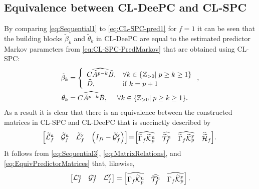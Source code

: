 \subsection{Equivalence between \ac{CL-DeePC} and \ac{CL-SPC}}
By comparing \eqref{eq:Sequential1} to \eqref{eq:CL-SPC-pred1} for $f=1$ it can be seen that the building blocks $\tilde{\beta}_k$ and $\tilde{\theta}_k$ in \ac{CL-DeePC} are equal to the estimated predictor Markov parameters from \eqref{eq:CL-SPC-PredMarkov} that are obtained using \ac{CL-SPC}:
\begin{subequations}\label{eq:EquivMarkov}
	\begin{align}
		\tilde{\beta}_k &= \left\{\begin{array}{ll}
			\widehat{C\tilde{A}^{p-k}\tilde{B}}, &\forall k\in\{\mathbb{Z}_{>0}|\;p \geq k \geq 1\}\\
			\widehat{D}, &\text{if } k=p+1
		\end{array}\right.,\label{eq:EquivMarkovInputs}\\
	\tilde{\theta}_k &= \widehat{C\tilde{A}^{p-k}\tilde{B}},\mkern24mu \forall k\in\{\mathbb{Z}_{>0}|\;p \geq k \geq 1\}\label{eq:EquivMarkovOutputs}.
	\end{align}
\end{subequations}
As a result it is clear that there is an equivalence between the constructed matrices in \ac{CL-SPC} and \ac{CL-DeePC} that is succinctly described by
\begin{align}\label{eq:EquivPredictorMatrices}
	\mkern-3mu\begin{bmatrix}
		\widetilde{\mathcal{L}}^\mathrm{u}_f & \widetilde{\mathcal{G}}^\mathrm{u}_f & \widetilde{\mathcal{L}}^\mathrm{y}_f & \left(I_{fl}-\widetilde{\mathcal{G}}^\mathrm{y}_f\right)
	\end{bmatrix}\mkern-3mu=\mkern-3mu\begin{bmatrix}
		\widehat{\widetilde{\Gamma}_f\widetilde{\mathcal{K}}_{p}^{\mathrm{{u}}}} & \widehat{\widetilde{\mathcal{T}}_f^\mathrm{u}} & \widehat{\widetilde{\Gamma}_f\widetilde{\mathcal{K}}_{p}^{\mathrm{{y}}}} & \widehat{\widetilde{\mathcal{H}}}_f
	\end{bmatrix}\mkern-3mu.
\end{align}
It follows from \eqref{eq:Sequential3}, \eqref{eq:MatrixRelations}, and \eqref{eq:EquivPredictorMatrices} that, likewise,
\begin{align}\label{eq:EquivInnovationMatrices}
	\begin{bmatrix}
		\mathcal{L}^\mathrm{u}_f & \mathcal{G}^\mathrm{u}_f & \mathcal{L}^\mathrm{y}_f
	\end{bmatrix}=\begin{bmatrix}
		\widehat{\Gamma_f\widetilde{\mathcal{K}}_{p}^{\mathrm{{u}}}} & \widehat{\mathcal{T}_f^\mathrm{u}} & \widehat{\Gamma_f\widetilde{\mathcal{K}}_{p}^{\mathrm{{y}}}}
	\end{bmatrix}.
\end{align}
